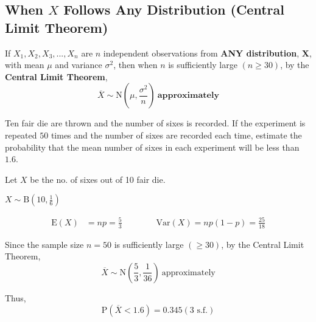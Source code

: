 \documentclass[11pt,a4paper]{book}
\begin{document}
\subsection{When $X$ Follows Any Distribution (Central Limit Theorem)}

\begin{tcolorbox}[colback=blue!5, colframe=black, boxrule=.4pt, sharpish corners]

If $X_{1},X_{2},X_{3},...,X_{n}$ are $n$ independent observations
from \textbf{ANY distribution}, $\boldsymbol{X}$, with mean $\mu$ and variance
$\sigma^{2}$, then when $n$ is sufficiently large $\left(n\geq30\right)$,
by the \textbf{Central Limit Theorem}, 
\[
\overline{X}\sim\text{N}\left(\mu,\frac{\sigma^{2}}{n}\right)\:\textbf{approximately}
\]

\end{tcolorbox}

\begin{example}

Ten fair die are thrown and the number of sixes is recorded. If the
experiment is repeated $50$ times and the number of sixes are recorded
each time, estimate the probability that the mean number of sixes
in each experiment will be less than $1.6$. 

\Solution
Let $X$ be the no. of sixes out of 10 fair die.

${\displaystyle X\sim\text{B}\left(10,\frac{1}{6}\right)}$

\begin{align*}
\text{E}\left(X\right) & =np=\frac{5}{3}\qquad\qquad\text{Var}\left(X\right)=np\left(1-p\right)=\frac{25}{18}
\end{align*}

Since the sample size $n=50$ is sufficiently large $\left(\geq30\right)$,
by the Central Limit Theorem,
\[
\overline{X}\sim\text{N}\left(\frac{5}{3},\frac{1}{36}\right)\:\text{approximately}
\]

Thus,
\[
\text{P}\left(\overline{X}<1.6\right)=0.345(\text{3 s.f.})
\]
\end{example}
\end{document}
